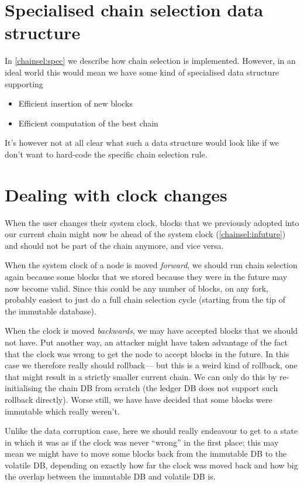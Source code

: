 \section{Specialised chain selection data structure}

In \cref{chainsel:spec} we describe how chain selection is implemented. However,
in an ideal world this would mean we have some kind of specialised data
structure supporting

\begin{itemize}
\item Efficient insertion of new blocks
\item Efficient computation of the best chain
\end{itemize}

It's however not at all clear what such a data structure would look like if we
don't want to hard-code the specific chain selection rule.

\section{Dealing with clock changes}
\label{future:clockchanges}

When the user changes their system clock, blocks that we previously adopted
into our current chain might now be ahead of the system clock (\cref{chainsel:infuture}) and should not
be part of the chain anymore, and vice versa.

When the system clock of a node is moved \emph{forward}, we should run chain
selection again because some blocks that we stored because they were in the
future may now become valid. Since this could be any number of blocks, on any
fork, probably easiest to just do a full chain selection cycle (starting from
the tip of the immutable database).

When the clock is moved \emph{backwards}, we may have accepted blocks that we
should not have. Put another way, an attacker might have taken advantage of the
fact that the clock was wrong to get the node to accept blocks in the future. In
this case we therefore really should rollback--- but this is a weird kind of
rollback, one that might result in a strictly smaller current chain. We can only
do this by re-initialising the chain DB from scratch (the ledger DB does not
support such rollback directly). Worse still, we have have decided that some
blocks were immutable which really weren't.

Unlike the data corruption case, here we should really endeavour to get to a
state in which it was as if the clock was never ``wrong'' in the first place;
this may mean we might have to move some blocks back from the immutable DB to
the volatile DB, depending on exactly how far the clock was moved back and how
big the overlap between the immutable DB and volatile DB is.

